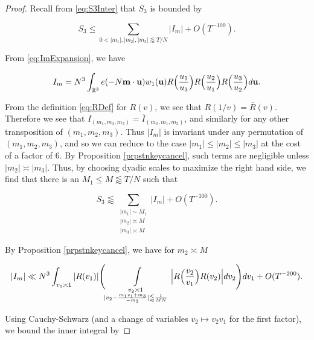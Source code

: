 \documentclass{amsart}
\theoremstyle{plain}
\numberwithin{equation}{section}
\begin{document}
\begin{proof} 
Recall from \eqref{eq:S3Inter} that $S_3$ is bounded by

\[
S_3\le \sum_{0<|m_1|,|m_2|,|m_3| \lessapprox T/N} |I_m| +O(T^{-100}).
\]

From \eqref{eq:ImExpansion}, we have

\[
I_m= N^3\int_{\mathbb{R}^3}e(-N \mathbf{m}\cdot \mathbf{u})w_1(\mathbf{u}) R\Bigl(\frac{u_1}{u_3}\Bigr)R\Bigl(\frac{u_2}{u_1}\Bigr)R\Bigl(\frac{u_3}{u_2}\Bigr)d\mathbf{u}.
\]

From the definition \eqref{eq:RDef} for $R(v)$, we see that $R(1/v) = \overline R(v)$. Therefore we see that $I_{(m_1,m_2,m_3)}=\overline I_{(m_2,m_1,m_3)}$, and similarly for any other transposition of $(m_1,m_2,m_3)$. Thus $|I_m|$ is invariant under any permutation of $(m_1,m_2,m_3)$, and so we can reduce to the case $|m_1|\le |m_2|\le |m_3|$ at the cost of a factor of 6. By Proposition \ref{prpstnkeycancel}, such terms are negligible unless $|m_2|\asymp |m_3|$. Thus, by choosing dyadic scales to maximize the right hand side, we find that there is an $M_1\le M\lessapprox T/N$ such that

\begin{equation}
S_3\lessapprox  \sum_{\substack{|m_1|\sim M_1 \\ |m_2|\asymp M\\ |m_3|\asymp M}} |I_m| +O(T^{-100}).
\label{eq:S3Expansion}
\end{equation}

By Proposition \ref{prpstnkeycancel},  we have for $m_2\asymp M$

\[
|I_m| \ll N^3  \int_{v_1 \asymp 1}  | R(v_1) |  \Biggl(\int\limits_{\substack{v_2\asymp 1\\ | v_2 - \frac{m_1 v_1 + m_3}{-m_2} | \lessapprox  \frac{1}{M N}}}  \Big| R\Bigl(\frac{v_2}{v_1}\Bigr)R( v_2) \Big| dv_2 \Bigg) dv_1+O(T^{-200}).
\]

Using Cauchy-Schwarz (and a change of variables $v_2\mapsto v_2v_1$ for the first factor),  we bound the inner integral by


\end{proof}
\end{document}
